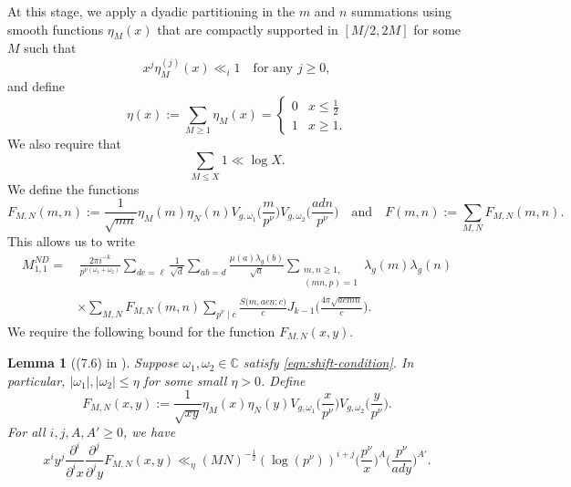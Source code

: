 \documentclass[12pt]{amsart}
\theoremstyle{plain}
\newtheorem{lem}{Lemma}[subsection]
\theoremstyle{definition}
\begin{document}
    At this stage, we apply a dyadic partitioning in the $m$ and $n$ summations using  smooth functions $\eta_M(x)$ that are compactly supported in $[M/2, 2M]$ for some $M$ such that
\[
x^j \eta_M^{(j)}(x) \ll_i 1 \quad \text{for any } j \geq 0,
\]
and define
\[
\eta(x) := \sum_{M \geq 1} \eta_M(x)=\begin{cases}0& x \leq \tfrac{1}{2}\\ 1& x\geq1.\end{cases}
\]
We also require that
\[
\sum_{M \leq X} 1 \ll \log X.
\]
  We define the functions 
    \[
    F_{M, N}(m, n) := \frac{1}{\sqrt{mn}}  \eta_M(m) \eta_N(n)
    V_{g, \omega_1}\Big(\frac{m}{p^\nu }\Big) 
    V_{g, \omega_2}\Big(\frac{adn}{p^\nu }\Big)
    \quad
    \text{and} 
    \quad
    F(m, n) := \sum_{M, N} F_{M, N}(m, n) .
    \]
This allows us to write
    \begin{equation}\label{eq:M ND 11} 
    \begin{split}
    M^{ND}_{1, 1}    
    = &\,  \frac{2\pi i^{-k} }{
    p^{\nu(\omega_1+\omega_2)}} 
     \sum_{de= \ell} 
     \frac{1}{\sqrt d}
     \sum_{ab=d}
     \frac{\mu(a) \lambda_g(b)}{\sqrt a}
     \sum_{\substack{m, n \geq 1,\\ (mn, p)=1}}
    \lambda_g(m) \lambda_g(n)
    \\
    & \times \sum_{M, N} F_{M, N}(m, n)
    \sum_{p^\nu \mid c} 
    \frac{S\big(m, aen; c\big)}{c}
    J_{k-1}\Big(\frac{4\pi\sqrt{aemn}}{c}\Big) .
    \end{split}
    \end{equation}
 We require the following bound for the function $F_{M,N}(x,y)$.
 \begin{lem}[(7.6) in \cite{KMV RS}] 
\label{lem:F bound} 
Suppose $\omega_1,\omega_2\in\mathbb{C}$ satisfy \eqref{eqn:shift-condition}. In particular, $|\omega_1|,|\omega_2|\leq\eta$ for some small $\eta>0$. Define
    \[
    F_{M, N}(x, y) 
    := \frac{1}{\sqrt{xy}}  \eta_M(x) \eta_N(y)
    V_{g, \omega_1}\Big(\frac{x}{p^\nu}\Big) 
    V_{g, \omega_2}\Big(\frac{y}{p^\nu}\Big).
    \]
For all $i, j, A, A' \geq 0$, we have
    \[
    x^i y^j \frac{\partial^i}{\partial^i x} 
    \frac{\partial^j}{\partial^j y}
    F_{M, N}(x, y)
    \ll_{\eta}(MN)^{-\frac12} 
    (\log(p^\nu ))^{i+j}
    \Big(\frac{p^\nu}{x}\Big)^A
    \Big(\frac{p^\nu}{ady}\Big)^{A'}.
    \]
\end{lem}
\end{document}
